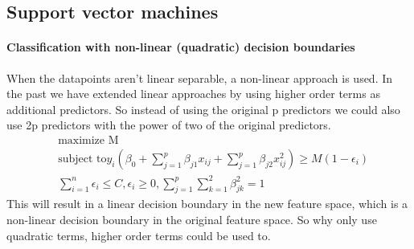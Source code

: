 \documentclass[../document.tex]{subfiles}
\begin{document}
	\subsection{Support vector machines}

	\paragraph{Classification with non-linear (quadratic) decision boundaries}
	When the datapoints aren't linear separable, a non-linear approach is used. In the past we have extended linear approaches by using higher order terms as additional predictors. So instead of using the original p predictors we could also use 2p predictors with the power of two of the original predictors.
	\begin{equation}
	\begin{split}
		&\text{maximize M}\\
		&\text{subject to} y_{i}(\beta_{0}+\sum_{j=1}^{p}\beta_{j1}x_{ij}+\sum_{j=1}^{p}\beta_{j2}x_{ij}^2)\ge M(1-\epsilon_{i})\\
		&\sum_{i=1}^{n}\epsilon_{i}\le C, \epsilon_{i}\ge 0, \sum_{j=1}^{p}\sum_{k=1}^{2}\beta_{jk}^2=1
	\end{split}
	\end{equation}
	This will result in a linear decision boundary in the new feature space, which is a non-linear decision boundary in the original feature space. So why only use quadratic terms, higher order terms could be used to.
\end{document}
